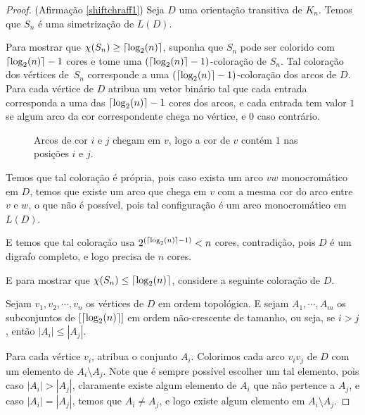 \begin{proof}(Afirmação \ref{shiftchraff1})
Seja $D$ uma orientação transitiva de $K_n$. Temos que $S_n$ é uma simetrização de $L(D)$. 

Para mostrar que $\chi(S_n) \geq \lceil\log_2(n)\rceil$, suponha que $S_n$ pode ser colorido com~$\lceil\log_2(n)\rceil - 1$ cores e tome uma $(\lceil\log_2(n)\rceil -1)$-coloração de $S_n$. Tal coloração dos vértices de~$S_n$ corresponde a uma $(\lceil\log_2(n)\rceil-1)$-coloração dos arcos de $D$. Para cada vértice de $D$ atribua um vetor binário tal que cada entrada corresponda a uma das $\lceil\log_2(n)\rceil-1$ cores dos arcos, e cada entrada tem valor $1$ se algum arco da cor correspondente chega no vértice, e $0$ caso contrário. 

\begin{figure}[H]
\centering
\caption{Arcos de cor $i$ e $j$ chegam em $v$, logo a cor de $v$ contém $1$ nas posições $i$ e $j$.}
\label{fig:shiftchromaticvector}
\end{figure}

Temos que tal coloração é própria, pois caso exista um arco $vw$ monocromático em $D$, temos que existe um arco que chega em $v$ com a mesma cor do arco entre $v$ e $w$, o que não é possível, pois tal configuração é um arco monocromático em $L(D)$. 

E temos que tal coloração usa $2^{(\lceil\log_2(n)\rceil-1)} < n$ cores, contradição, pois $D$ é um digrafo completo, e logo precisa de $n$ cores.

E para mostrar que $\chi(S_n) \leq \lceil\log_2(n)\rceil$, considere a seguinte coloração de $D$.

Sejam $v_1, v_2,\cdots, v_n$ os vértices de $D$ em ordem topológica. E sejam $A_1, \cdots, A_m$ os subconjuntos de $[\lceil\log_2(n)\rceil]$ em ordem não-crescente de tamanho, ou seja, se $i > j$, então $|A_i| \leq |A_j|$.

Para cada vértice $v_i$, atribua o conjunto $A_i$. Colorimos cada arco $v_iv_j$ de $D$ com um elemento de $A_i\setminus A_j$. Note que é sempre possível escolher um tal elemento, pois caso $|A_i| > |A_j|$, claramente existe algum elemento de $A_i$ que não pertence a $A_j$, e caso $|A_i| = |A_j|$, temos que $A_i \neq A_j$, e logo existe algum elemento em $A_i\setminus A_j$.


\end{proof}
